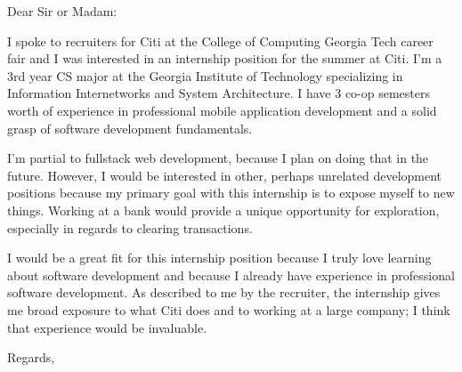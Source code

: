 \documentclass{letter}
\begin{document}
\begin{letter}{}
\opening{Dear Sir or Madam:}

I spoke to recruiters for Citi at the College of Computing Georgia Tech career fair and I was interested in an internship position for the summer at Citi. I'm a 3rd year CS major at the Georgia Institute of Technology specializing in Information Internetworks and System Architecture. I have 3 co-op semesters worth of experience in professional mobile application development and a solid grasp of software development fundamentals. 

I'm partial to fullstack web development, because I plan on doing that in the future. However, I would be interested in other, perhaps unrelated development positions because my primary goal with this internship is to expose myself to new things. Working at a bank would provide a unique opportunity for exploration, especially in regards to clearing transactions.

I would be a great fit for this internship position because I truly love learning about software development and because I already have experience in professional software development. As described to me by the recruiter, the internship gives me broad exposure to what Citi does and to working at a large company; I think that experience would be invaluable.


\closing{Regards,}
\end{letter}
\end{document}
